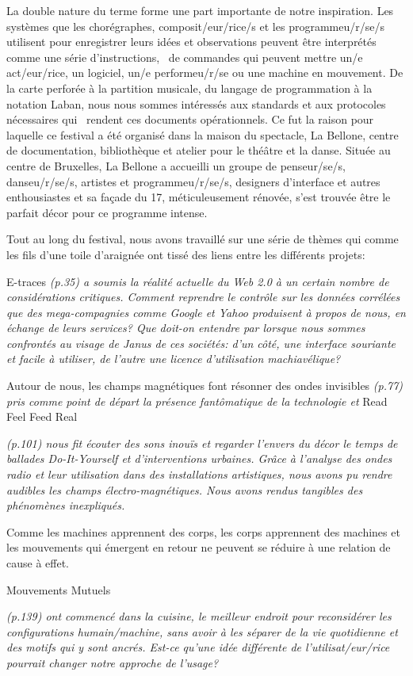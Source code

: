 {{{La double nature du terme  forme une part importante de notre inspiration. Les syst\`emes que les chor\'egraphes, composit/eur/rice/s et les programmeu/r/se/s utilisent pour enregistrer leurs id\'ees et observations peuvent \^etre interpr\'et\'es comme une s\'erie d'instructions, \ de commandes qui peuvent mettre un/e act/eur/rice, un logiciel, un/e performeu/r/se ou une machine en mouvement. De la carte perfor\'ee \`a la partition musicale, du langage de programmation \`a la notation Laban, nous nous sommes int\'eress\'es aux standards et aux protocoles n\'ecessaires qui \ rendent ces documents op\'erationnels. Ce fut la raison pour laquelle ce festival a \'et\'e organis\'e dans la maison du spectacle, La Bellone, centre de documentation, biblioth\`eque et atelier pour le th\'e\^atre et la danse. Situ\'ee au centre de Bruxelles, La Bellone a accueilli un groupe de penseur/se/s, danseu/r/se/s, artistes et programmeu/r/se/s, designers d'interface et autres enthousiastes et sa fa\c{c}ade du 17, m\'eticuleusement r\'enov\'ee, s'est trouv\'ee \^etre le parfait d\'ecor pour ce programme intense.

Tout au long du festival, nous avons travaill\'e sur une s\'erie de th\`emes qui comme les fils d'une toile d'araign\'ee ont tiss\'e des liens entre les diff\'erents projets:}

E-traces {\em (p.35) a soumis la r\'ealit\'e actuelle du Web 2.0 \`a un certain nombre de consid\'erations critiques. Comment reprendre le contr\^ole sur les donn\'ees corr\'el\'ees que des mega-compagnies comme Google et Yahoo produisent \`a propos de nous, en \'echange de leurs services? Que doit-on entendre par  lorsque nous sommes confront\'es au visage de Janus de ces soci\'et\'es: d'un c\^ot\'e, une interface souriante et facile \`a utiliser, de l'autre une licence d'utilisation machiav\'elique?}

Autour de nous, les champs magn\'etiques font r\'esonner des ondes invisibles {\em (p.77) pris comme point de d\'epart la pr\'esence fant\^omatique de la technologie et} Read Feel Feed Real {\em (p.101) nous fit \'ecouter des sons inou\"is et regarder l'envers du d\'ecor le temps de ballades Do-It-Yourself et d'interventions urbaines. Gr\^ace \`a l'analyse des ondes radio et leur utilisation dans des installations artistiques, nous avons pu rendre audibles les champs \'electro-magn\'etiques. Nous avons rendus tangibles des ph\'enom\`enes inexpliqu\'es.

Comme les machines apprennent des corps, les corps apprennent des machines et les mouvements qui \'emergent en retour ne peuvent se r\'eduire \`a une relation de cause \`a effet.} Mouvements Mutuels {\em (p.139) ont commenc\'e dans la cuisine, le meilleur endroit pour reconsid\'erer les configurations humain/machine, sans avoir \`a les s\'eparer de la vie quotidienne et des motifs qui y sont ancr\'es. Est-ce qu'une id\'ee diff\'erente de l'utilisat/eur/rice pourrait changer notre approche de l'usage? 

}}}

